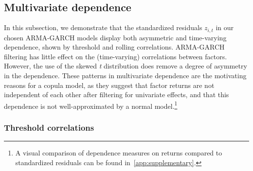 
\subsection{Multivariate dependence} %

In this subsection, we demonstrate that the standardized residuals $z_{i,t}$ in our chosen ARMA-GARCH models display both asymmetric and time-varying dependence, shown by threshold and rolling correlations. ARMA-GARCH filtering has little effect on the (time-varying) correlations between factors. However, the use of the skewed \emph{t} distribution does remove a degree of asymmetry in the dependence. These patterns in multivariate dependence are the motivating reasons for a copula model, as they suggest that factor returns are not independent of each other after filtering for univariate effects, and that this dependence is not well-approximated by a normal model.\footnote{A visual comparison of dependence measures on returns compared to standardized residuals can be found in~\autoref{app:supplementary}.}



\subsubsection{Threshold correlations}

